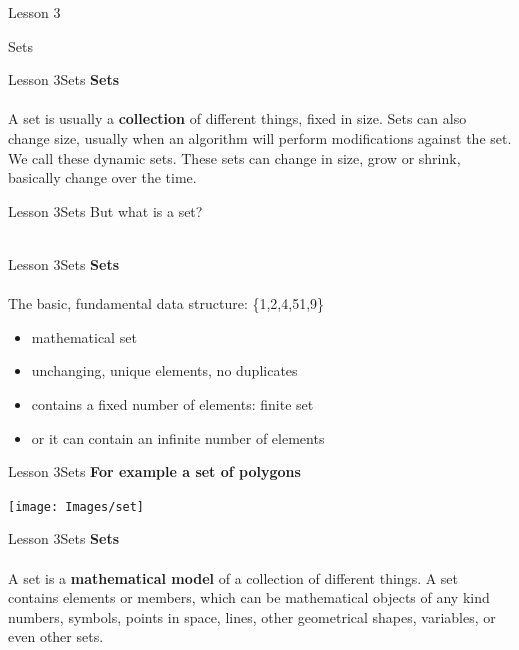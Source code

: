 \documentclass[aspectratio=1610]{beamer}
\begin{document}
\begin{frame}{Lesson 3}{}
\begin{center}
\Huge Sets
\end{center}
\end{frame}


\begin{frame}{Lesson 3}{Sets}
\LARGE
\textbf{Sets}\\~\\
A set is usually a \textbf{collection} of different things, fixed in size. Sets can also change size, usually when an algorithm will perform modifications against the set. We call these dynamic sets. These sets can change in size, grow or shrink, basically change over the time.
\end{frame}


\begin{frame}{Lesson 3}{Sets}
\Huge{But what is a set?}\\~\\
\end{frame}


\begin{frame}{Lesson 3}{Sets}
\LARGE
\textbf{Sets}\\~\\
The basic, fundamental data structure: \{1,2,4,51,9\}
\begin{itemize}
    \item mathematical set
    \item unchanging, unique elements, no duplicates
    \item contains a fixed number of elements: finite set
    \item or it can contain an infinite number of elements
\end{itemize}

\end{frame}


\begin{frame}{Lesson 3}{Sets}
\LARGE
\textbf{For example a set of polygons}
\begin{center}
\texttt{[image: Images/set]}
\end{center}
\end{frame}


\begin{frame}{Lesson 3}{Sets}
\LARGE
\textbf{Sets}\\~\\
A set is a \textbf{mathematical model} of a collection of different things. A set contains elements or members, which can be mathematical objects of any kind numbers, symbols, points in space, lines, other geometrical shapes, variables, or even other sets.

\end{frame}
\end{document}
